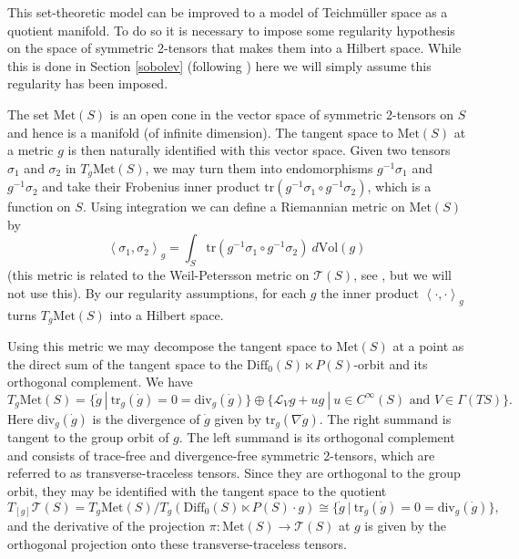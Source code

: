 This set-theoretic model can be improved to a model of Teichm\"uller space as a quotient manifold. To do so it is necessary to impose some regularity hypothesis on the space of symmetric 2-tensors that makes them into a Hilbert space. While this is done in Section \ref{sobolev} (following \cite{tromba1992}) here we will simply assume this regularity has been imposed.  

The set $\mathrm{Met}(S)$ is an open cone in the vector space of symmetric 2-tensors on $S$ and hence is a manifold (of infinite dimension). 
The tangent space to $\mathrm{Met}(S)$ at a metric $g$ is then naturally identified with this vector space. 
Given two tensors $\sigma_1$ and $\sigma_2$ in $T_g \mathrm{Met}(S)$, we may turn them into endomorphisms $g^{-1}\sigma_1$ and $g^{-1}\sigma_2$ and take their Frobenius inner product $\mathrm{tr}( g^{-1}\sigma_1 \circ g^{-1}\sigma_2)$, which is a function on $S$. 
Using integration we can define a Riemannian metric on $\mathrm{Met}(S)$ by 
\[
\left< \sigma_1, \sigma_2 \right>_g = \int_S \mathrm{tr}( g^{-1}\sigma_1 \circ g^{-1}\sigma_2) \ d\mathrm{Vol}(g)
\]
(this metric is related to the Weil-Petersson metric on $\mathcal{T}(S)$, see \cite{tromba1992}, but we will not use this). By our regularity assumptions, for each $g$ the inner product $\left< \cdot, \cdot \right>_g$ turns $T_g\mathrm{Met}(S)$ into a Hilbert space. 

Using this metric we may decompose the tangent space to $\mathrm{Met}(S)$ at a point as the direct sum of the tangent space to the $\mathrm{Diff}_0(S) \ltimes P(S)$-orbit and its orthogonal complement. 
We have
\[
T_g \mathrm{Met}(S) = \{ \dot{g} \ | \ \mathrm{tr}_g(\dot{g}) = 0 = \mathrm{div}_g(\dot{g})\} \oplus \{ \mathcal{L}_V g + ug \ | \ u \in C^\infty(S) \text{ and } V \in \Gamma(TS) \}.
\]
Here $\mathrm{div}_g(\dot{g})$ is the divergence of $\dot{g}$ given by $\mathrm{tr}_g(\nabla \dot{g})$. 
The right summand is tangent to the group orbit of $g$. 
The left summand is its orthogonal complement and consists of trace-free and divergence-free symmetric 2-tensors, which are referred to as transverse-traceless tensors. 
Since they are orthogonal to the group orbit, they may be identified with the tangent space to the quotient
\[
T_{[g]} \mathcal{T}(S) = T_g \mathrm{Met}(S)/T_g(\mathrm{Diff}_0(S) \ltimes P(S) \cdot g) \cong \{ \dot{g} \ | \ \mathrm{tr}_g(\dot{g}) = 0 = \mathrm{div}_g(\dot{g})\},
\]
and the derivative of the projection $\pi: \mathrm{Met}(S) \to \mathcal{T}(S)$ at $g$ is given by the orthogonal projection onto these transverse-traceless tensors. 

